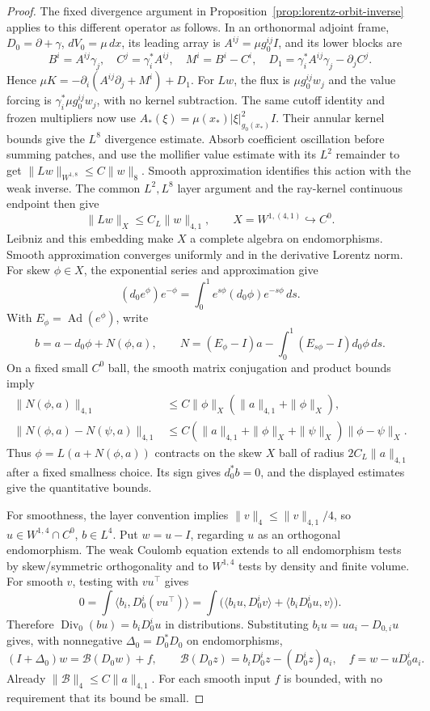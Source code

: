 \documentclass[11pt]{article}
\numberwithin{equation}{section}
\theoremstyle{definition}
\theoremstyle{remark}
\begin{document}
\begin{proof}
The fixed divergence argument in
Proposition~\ref{prop:lorentz-orbit-inverse} applies to this
different operator as follows. In an orthonormal adjoint frame,
\(D_0=\partial+\gamma\), \(dV_0=\mu\,dx\), its leading array
is \(A^{ij}=\mu g_0^{ij}I\), and its lower blocks are
\[
 B^i=A^{ij}\gamma_j,\quad C^j=\gamma_i^*A^{ij},\quad
 M^i=B^i-C^i,\quad
 D_1=\gamma_i^*A^{ij}\gamma_j-\partial_jC^j .
\]
Hence \(\mu K=-\partial_i(A^{ij}\partial_j+M^i)+D_1\).
For \(Lw\), the flux is \(\mu g_0^{ij}w_j\) and the value
forcing is \(\gamma_i^*\mu g_0^{ij}w_j\), with no kernel
subtraction. The same cutoff identity and frozen multipliers
now use \(A_*(\xi)=\mu(x_*)|\xi|_{g_0(x_*)}^2I\).
Their annular kernel bounds give the \(L^8\) divergence
estimate. Absorb coefficient oscillation before summing
patches, and use the mollifier value estimate with its
\(L^2\) remainder to get
\(\|Lw\|_{W^{1,8}}\le C\|w\|_8\).
Smooth approximation identifies this action with the weak
inverse. The common \(L^2,L^8\) layer argument and the
ray-kernel continuous endpoint then give
\[
 \|Lw\|_X\le C_L\|w\|_{4,1},\qquad
 X=W^{1,(4,1)}\hookrightarrow C^0 .
\]
Leibniz and this embedding make \(X\) a complete algebra
on endomorphisms. Smooth approximation converges uniformly
and in the derivative Lorentz norm. For skew \(\phi\in X\),
the exponential series and approximation give
\[
 (d_0e^\phi)e^{-\phi}
       =\int_0^1e^{s\phi}(d_0\phi)e^{-s\phi}\,ds .
\]
With \(E_\phi=\operatorname{Ad}(e^\phi)\), write
\[
 b=a-d_0\phi+N(\phi,a),\qquad
 N=(E_\phi-I)a-\int_0^1(E_{s\phi}-I)d_0\phi\,ds .
\]
On a fixed small \(C^0\) ball, the smooth matrix conjugation
and product bounds imply
\[
 \begin{split}
 \|N(\phi,a)\|_{4,1}
   &\le C\|\phi\|_X(\|a\|_{4,1}+\|\phi\|_X),\\
 \|N(\phi,a)-N(\psi,a)\|_{4,1}
   &\le C(\|a\|_{4,1}+\|\phi\|_X+\|\psi\|_X)
                   \|\phi-\psi\|_X .
 \end{split}
\]
Thus \(\phi=L(a+N(\phi,a))\) contracts on the skew
\(X\) ball of radius \(2C_L\|a\|_{4,1}\) after a fixed
smallness choice. Its sign gives \(d_0^*b=0\), and
the displayed estimates give the quantitative bounds.

For smoothness, the layer convention implies
\(\|v\|_4\le\|v\|_{4,1}/4\), so
\(u\in W^{1,4}\cap C^0\), \(b\in L^4\).
Put \(w=u-I\), regarding \(u\) as an orthogonal
endomorphism. The weak Coulomb equation extends to all
endomorphism tests by skew/symmetric orthogonality and
to \(W^{1,4}\) tests by density and finite volume.
For smooth \(v\), testing with \(vu^\top\) gives
\[
 0=\int\langle b_i,D_0^i(vu^\top)\rangle
   =\int\bigl(\langle b_i u,D_0^iv\rangle
                  +\langle b_iD_0^iu,v\rangle\bigr).
\]
Therefore \(\operatorname{Div}_0(bu)=b_iD_0^iu\) in
distributions. Substituting \(b_i u=u a_i-D_{0,i}u\)
gives, with nonnegative \(\Delta_0=D_0^*D_0\) on endomorphisms,
\[
 (I+\Delta_0)w=\mathcal B(D_0w)+f,\qquad
 \mathcal B(D_0z)=b_iD_0^iz-(D_0^iz)a_i,\quad
 f=w-uD_0^ia_i .
\]
Already \(\|\mathcal B\|_4\le C\|a\|_{4,1}\).
For each smooth input \(f\) is bounded, with no requirement
that its bound be small.


\end{proof}
\end{document}
